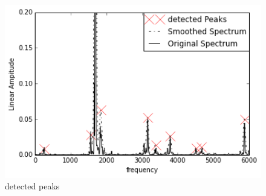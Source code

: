         \begin{figure}[h]
            \begin{center}
                \includegraphics[width = 14cm]{BAK4_final_files/BAK4_final_23_1.png}
                \caption{detected peaks}
                \label{detected}
            \end{center}
        \end{figure}
        
        
                
    





    
    
    
